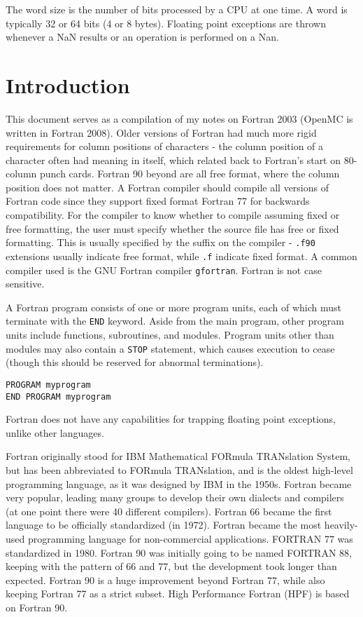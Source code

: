 \documentclass[10pt]{article}
\begin{document}
The word size is the number of bits processed by a CPU at one time. A word is typically 32 or 64 bits (4 or 8 bytes). Floating point exceptions are thrown whenever a NaN results or an operation is performed on a Nan. 

\section{Introduction}

This document serves as a compilation of my notes on Fortran 2003 (OpenMC is written in Fortran 2008). Older versions of Fortran had much more rigid requirements for column positions of characters - the column position of a character often had meaning in itself, which related back to Fortran's start on 80-column punch cards. Fortran 90 beyond are all free format, where the column position does not matter. A Fortran compiler should compile all versions of Fortran code since they support fixed format Fortran 77 for backwards compatibility. For the compiler to know whether to compile assuming fixed or free formatting, the user must specify whether the source file has free or fixed formatting. This is usually specified by the suffix on the compiler - {\tt .f90} extensions usually indicate free format, while {\tt .f} indicate fixed format. A common compiler used is the GNU Fortran compiler {\tt gfortran}. Fortran is not case sensitive.

A Fortran program consists of one or more program units, each of which must terminate with the {\tt END} keyword. Aside from the main program, other program units include functions, subroutines, and modules. Program units other than modules may also contain a {\tt STOP} statement, which causes execution to cease (though this should be reserved for abnormal terminations).  

\begin{lstlisting}
PROGRAM myprogram
END PROGRAM myprogram
\end{lstlisting}

Fortran does not have any capabilities for trapping floating point exceptions, unlike other languages. 

Fortran originally stood for IBM Mathematical FORmula TRANslation System, but has been abbreviated to FORmula TRANslation, and is the oldest high-level programming language, as it was designed by IBM in the 1950s. Fortran became very popular, leading many groups to develop their own dialects and compilers (at one point there were 40 different compilers). Fortran 66 became the first language to be officially standardized (in 1972). Fortran became the most heavily-used programming language for non-commercial applications. FORTRAN 77 was standardized in 1980. Fortran 90 was initially going to be named FORTRAN 88, keeping with the pattern of 66 and 77, but the development took longer than expected. Fortran 90 is a huge improvement beyond Fortran 77, while also keeping Fortran 77 as a strict subset. High Performance Fortran (HPF) is based on Fortran 90.
\end{document}
